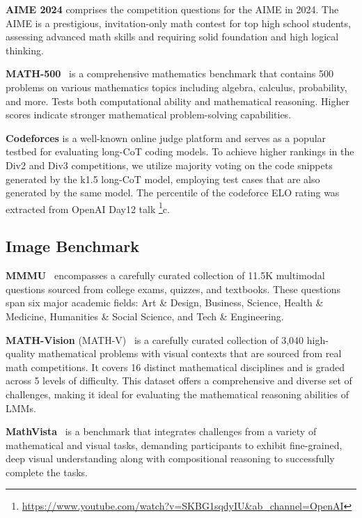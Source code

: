 \documentclass{article}
\newcommand{\citep}[1]{\parencite{#1}}
\begin{document}
\textbf{AIME 2024} comprises the competition questions for the AIME in 2024. The AIME is a prestigious, invitation-only math contest for top high school students, assessing advanced math skills and requiring solid foundation and high logical thinking.

\textbf{MATH-500}~\citep{lightman2023lets} is a comprehensive mathematics benchmark that contains 500 problems on various mathematics topics including algebra, calculus, probability, and more. Tests both computational ability and mathematical reasoning. Higher scores indicate stronger mathematical problem-solving capabilities. 


\textbf{Codeforces} is a well-known online judge platform and serves as a popular testbed for evaluating long-CoT coding models. To achieve higher rankings in the Div2 and Div3 competitions, we utilize majority voting on the code snippets generated by the k1.5 long-CoT model, employing test cases that are also generated by the same model. The percentile of the codeforce ELO rating was extracted from OpenAI Day12 talk \footnote{\url{https://www.youtube.com/watch?v=SKBG1sqdyIU&ab_channel=OpenAI}}c.

\subsection{Image Benchmark}

\textbf{MMMU}~\citep{yue2024mmmu} encompasses a carefully curated collection of 11.5K multimodal questions sourced from college exams, quizzes, and textbooks. These questions span six major academic fields: Art \& Design, Business, Science, Health \& Medicine, Humanities \& Social Science, and Tech \& Engineering.

\textbf{MATH-Vision} (MATH-V)~\citep{wang2024measuring} is a carefully curated collection of 3,040 high-quality mathematical problems with visual contexts that are sourced from real math competitions. It covers 16 distinct mathematical disciplines and is graded across 5 levels of difficulty. This dataset offers a comprehensive and diverse set of challenges, making it ideal for evaluating the mathematical reasoning abilities of LMMs.

\textbf{MathVista}~\citep{lu2023mathvista} is a benchmark that integrates challenges from a variety of mathematical and visual tasks, demanding participants to exhibit fine-grained, deep visual understanding along with compositional reasoning to successfully complete the tasks.
\end{document}
